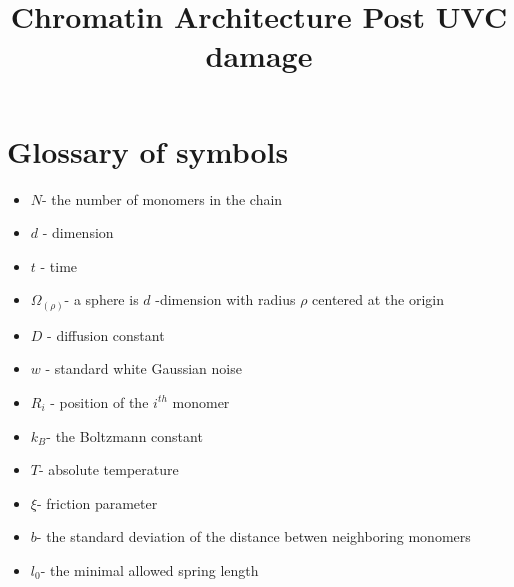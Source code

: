 \documentclass[12pt]{report}
\begin{document}
	
	\title{Chromatin Architecture Post UVC damage}
	\maketitle
	\section{Glossary of symbols}
	\begin{itemize}
		\itemsep0em
		\item $N$- the number of monomers in the chain
		\item $d$ - dimension 
		\item $t$ - time
		\item $\Omega_(\rho)$- a sphere is $d$ -dimension with radius $\rho$ centered at the origin
		\item $D$ - diffusion constant
		\item $w$ - standard white Gaussian noise
		\item $R_i$ - position of the $i^{th}$ monomer
		\item $k_B$- the Boltzmann constant
		\item $T$- absolute temperature
		\item $\xi$- friction parameter
		\item $b$- the standard deviation of the distance betwen neighboring monomers
		\item $l_0$- the minimal allowed spring length
		
	\end{itemize}
\end{document}
